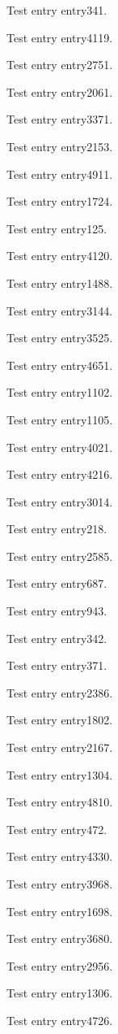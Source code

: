 Test entry \gls{entry341}.

Test entry \gls{entry4119}.

Test entry \gls{entry2751}.

Test entry \gls{entry2061}.

Test entry \gls{entry3371}.

Test entry \gls{entry2153}.

Test entry \gls{entry4911}.

Test entry \gls{entry1724}.

Test entry \gls{entry125}.

Test entry \gls{entry4120}.

Test entry \gls{entry1488}.

Test entry \gls{entry3144}.

Test entry \gls{entry3525}.

Test entry \gls{entry4651}.

Test entry \gls{entry1102}.

Test entry \gls{entry1105}.

Test entry \gls{entry4021}.

Test entry \gls{entry4216}.

Test entry \gls{entry3014}.

Test entry \gls{entry218}.

Test entry \gls{entry2585}.

Test entry \gls{entry687}.

Test entry \gls{entry943}.

Test entry \gls{entry342}.

Test entry \gls{entry371}.

Test entry \gls{entry2386}.

Test entry \gls{entry1802}.

Test entry \gls{entry2167}.

Test entry \gls{entry1304}.

Test entry \gls{entry4810}.

Test entry \gls{entry472}.

Test entry \gls{entry4330}.

Test entry \gls{entry3968}.

Test entry \gls{entry1698}.

Test entry \gls{entry3680}.

Test entry \gls{entry2956}.

Test entry \gls{entry1306}.

Test entry \gls{entry4726}.

